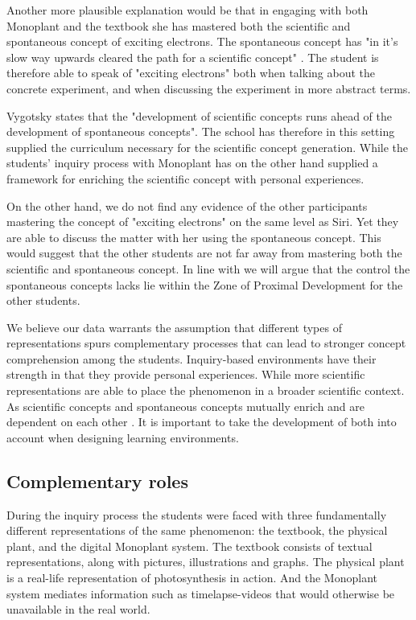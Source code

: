 Another more plausible explanation would be that in engaging with both Monoplant and the textbook she has mastered both the scientific and spontaneous concept of exciting electrons. The spontaneous concept has "in it's slow way upwards cleared the path for a scientific concept" \citep{vygotsky2012thought}. The student is therefore able to speak of "exciting electrons" both when talking about the concrete experiment, and when discussing the experiment in more abstract terms. 

Vygotsky states that the "development of scientific concepts runs ahead of the development of spontaneous concepts". The school has therefore in this setting supplied the curriculum necessary for the scientific concept generation. While the students' inquiry process with Monoplant has on the other hand supplied a framework for enriching the scientific concept with personal experiences.

On the other hand, we do not find any evidence of the other participants mastering the concept of "exciting electrons" on the same level as Siri. Yet they are able to discuss the matter with her using the spontaneous concept. This would suggest that the other students are not far away from mastering both the scientific and spontaneous concept. In line with \citet{vygotsky2012thought} we will argue that the control the spontaneous concepts lacks lie within the Zone of Proximal Development for the other students. 

We believe our data warrants the assumption that different types of representations spurs complementary processes that can lead to stronger concept comprehension among the students. Inquiry-based environments have their strength in that they provide personal experiences. While more scientific representations are able to place the phenomenon in a broader scientific context. As scientific concepts and spontaneous concepts mutually enrich and are dependent on each other \citep{vygotsky2012thought}. It is important to take the development of both into account when designing learning environments. 




\subsection{Complementary roles}
During the inquiry process the students were faced with three fundamentally different representations of the same phenomenon: the textbook, the physical plant, and the digital Monoplant system. The textbook consists of textual representations, along with pictures, illustrations and graphs. The physical plant is a real-life representation of photosynthesis in action. And the Monoplant system mediates information such as timelapse-videos that would otherwise be unavailable in the real world. 

